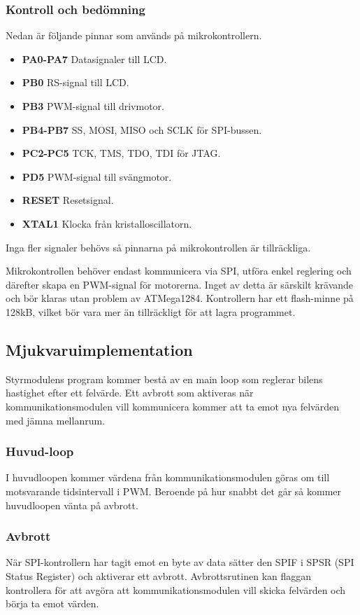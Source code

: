 \documentclass[designspec/spec.tex]{subfiles}
\begin{document}
\subsubsection{Kontroll och bedömning}
Nedan är följande pinnar som används på mikrokontrollern.
\begin{itemize}
   \item \textbf{PA0-PA7} Datasignaler till LCD.
   \item \textbf{PB0} RS-signal till LCD.
   \item \textbf{PB3} PWM-signal till drivmotor.
   \item \textbf{PB4-PB7} SS, MOSI, MISO och SCLK för SPI-bussen.
   \item \textbf{PC2-PC5} TCK, TMS, TDO, TDI för JTAG.
   \item \textbf{PD5} PWM-signal till svängmotor.
   \item \textbf{RESET} Resetsignal.
   \item \textbf{XTAL1} Klocka från kristalloscillatorn.
\end{itemize}
Inga fler signaler behövs så pinnarna på mikrokontrollen är tillräckliga.

Mikrokontrollen behöver endast kommunicera via SPI, utföra enkel reglering och
därefter skapa en PWM-signal för motorerna. Inget av detta är särskilt krävande
och bör klaras utan problem av ATMega1284. Kontrollern har ett flash-minne på
128kB, vilket bör vara mer än tillräckligt för att lagra programmet.

\subsection{Mjukvaruimplementation}
Styrmodulens program kommer bestå av en main loop som reglerar bilens hastighet
efter ett felvärde. Ett avbrott som aktiveras när kommunikationsmodulen vill
kommunicera kommer att ta emot nya felvärden med jämna mellanrum.

\subsubsection{Huvud-loop}
I huvudloopen kommer värdena från kommunikationsmodulen göras om till
motsvarande tidsintervall i PWM. Beroende på hur snabbt det går så kommer
huvudloopen vänta på avbrott.

\subsubsection{Avbrott} \label{sec:ctrl-int}
När SPI-kontrollern har tagit emot en byte av data sätter den SPIF i SPSR (SPI
Status Register) och aktiverar ett avbrott. Avbrottsrutinen kan flaggan
kontrollera för att avgöra att kommunikationsmodulen vill skicka felvärden och
börja ta emot värden.
\end{document}

